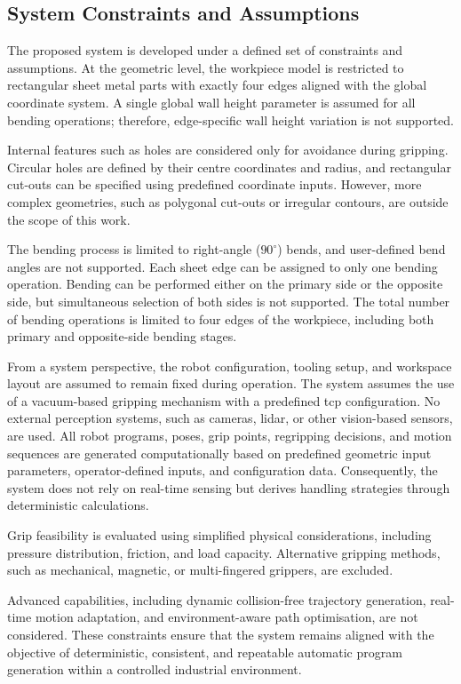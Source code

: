 \subsection{System Constraints and Assumptions}
\label{sec:system-constraints-and-assumptions}

The proposed system is developed under a defined set of constraints and assumptions. At the geometric level, the workpiece model is restricted to rectangular sheet metal parts with exactly four edges aligned with the global coordinate system. A single global wall height parameter is assumed for all bending operations; therefore, edge-specific wall height variation is not supported.

Internal features such as holes are considered only for avoidance during gripping. Circular holes are defined by their centre coordinates and radius, and rectangular cut-outs can be specified using predefined coordinate inputs. However, more complex geometries, such as polygonal cut-outs or irregular contours, are outside the scope of this work.

The bending process is limited to right-angle ($90^\circ$) bends, and user-defined bend angles are not supported. Each sheet edge can be assigned to only one bending operation. Bending can be performed either on the primary side or the opposite side, but simultaneous selection of both sides is not supported. The total number of bending operations is limited to four edges of the workpiece, including both primary and opposite-side bending stages.

From a system perspective, the robot configuration, tooling setup, and workspace layout are assumed to remain fixed during operation. The system assumes the use of a vacuum-based gripping mechanism with a predefined \ac{tcp} configuration. No external perception systems, such as cameras, \ac{lidar}, or other vision-based sensors, are used. All robot programs, poses, grip points, regripping decisions, and motion sequences are generated computationally based on predefined geometric input parameters, operator-defined inputs, and configuration data. Consequently, the system does not rely on real-time sensing but derives handling strategies through deterministic calculations.

Grip feasibility is evaluated using simplified physical considerations, including pressure distribution, friction, and load capacity. Alternative gripping methods, such as mechanical, magnetic, or multi-fingered grippers, are excluded.

Advanced capabilities, including dynamic collision-free trajectory generation, real-time motion adaptation, and environment-aware path optimisation, are not considered. These constraints ensure that the system remains aligned with the objective of deterministic, consistent, and repeatable automatic program generation within a controlled industrial environment.

